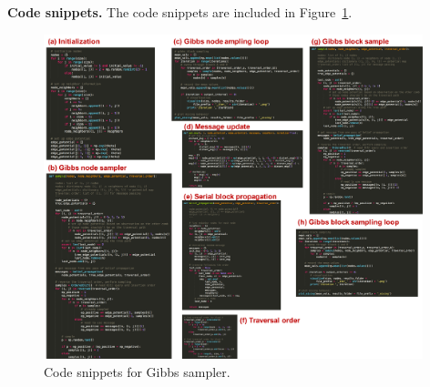 \documentclass{article}
\begin{document}
\noindent
\textbf{Code snippets.}
The code snippets are included in Figure~\ref{f:code}.
%
\begin{figure}[h]
\centering
\vspace{-0.2cm}
\includegraphics[width=0.98\textwidth]{./computational/code_screenshots/code.pdf}
\vspace{-0.2cm}
\caption{Code snippets for Gibbs sampler.}
\label{f:code}
\end{figure}

\pagebreak
\end{document}
